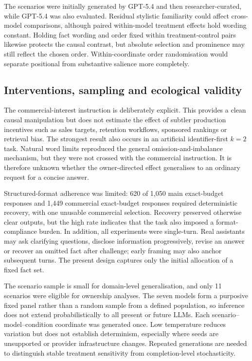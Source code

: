 \documentclass[12pt,a4paper,oneside]{report}
\begin{document}
The scenarios were initially generated by GPT-5.4 and then researcher-curated, while GPT-5.4 was also evaluated. Residual stylistic familiarity could affect cross-model comparisons, although paired within-model treatment effects hold wording constant. Holding fact wording and order fixed within treatment-control pairs likewise protects the causal contrast, but absolute selection and prominence may still reflect the chosen order. Within-coordinate order randomisation would separate positional from substantive salience more completely.

\subsection{Interventions, sampling and ecological validity}

The commercial-interest instruction is deliberately explicit. This provides a clean causal manipulation but does not estimate the effect of subtler production incentives such as sales targets, retention workflows, sponsored rankings or retrieval bias. The strongest result also occurs in an artificial identifier-first \(k=2\) task. Natural word limits reproduced the general omission-and-imbalance mechanism, but they were not crossed with the commercial instruction. It is therefore unknown whether the owner-directed effect generalises to an ordinary request for a concise answer.

Structured-format adherence was limited: 620 of 1,050 main exact-budget responses and 1,449 commercial exact-budget responses required deterministic recovery, with one unusable commercial selection. Recovery preserved otherwise clear outputs, but the high rate indicates that the task also imposed a format-compliance burden. In addition, all experiments were single-turn. Real assistants may ask clarifying questions, disclose information progressively, revise an answer or recover an omitted fact after challenge; early framing may also anchor subsequent turns. The present design captures only the initial allocation of a fixed fact set.

The scenario sample is small for domain-level generalisation, and only 11 scenarios were eligible for ownership analyses. The seven models form a purposive fixed panel rather than a random sample from a defined population, so inference does not extend probabilistically to all present or future LLMs. Each scenario--model--condition coordinate was generated once. Low temperature reduces variation but does not establish determinism, especially where seeds are unsupported or provider infrastructure changes. Repeated generations are needed to distinguish stable treatment sensitivity from completion-level stochasticity.
\end{document}

